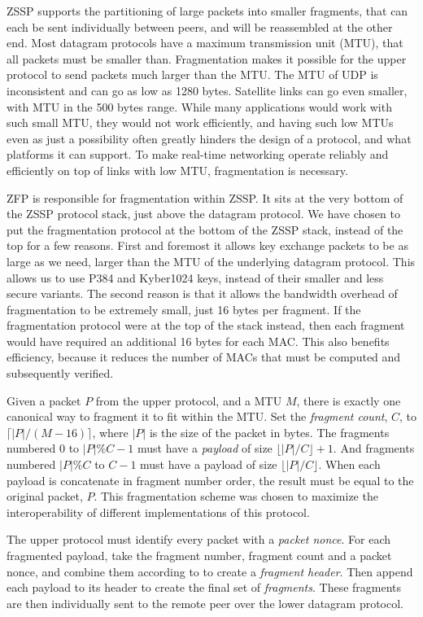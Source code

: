 \documentclass{article}
\begin{document}
ZSSP supports the partitioning of large packets into smaller fragments, that can each be sent individually between peers, and will be reassembled at the other end. Most datagram protocols have a maximum transmission unit (MTU), that all packets must be smaller than. Fragmentation makes it possible for the upper protocol to send packets much larger than the MTU. The MTU of UDP is inconsistent and can go as low as 1280 bytes. Satellite links can go even smaller, with MTU in the 500 bytes range. While many applications would work with such small MTU, they would not work efficiently, and having such low MTUs even as just a possibility often greatly hinders the design of a protocol, and what platforms it can support. To make real-time networking operate reliably and efficiently on top of links with low MTU, fragmentation is necessary.

ZFP is responsible for fragmentation within ZSSP. It sits at the very bottom of the ZSSP protocol stack, just above the datagram protocol. We have chosen to put the fragmentation protocol at the bottom of the ZSSP stack, instead of the top for a few reasons. First and foremost it allows key exchange packets to be as large as we need, larger than the MTU of the underlying datagram protocol. This allows us to use P384 and Kyber1024 keys, instead of their smaller and less secure variants. The second reason is that it allows the bandwidth overhead of fragmentation to be extremely small, just 16 bytes per fragment. If the fragmentation protocol were at the top of the stack instead, then each fragment would have required an additional 16 bytes for each MAC. This also benefits efficiency, because it reduces the number of MACs that must be computed and subsequently verified.

Given a packet $P$ from the upper protocol, and a MTU $M$, there is exactly one canonical way to fragment it to fit within the MTU. Set the \emph{fragment count}, $C$, to $\lceil|P|/(M - 16)\rceil$, where $|P|$ is the size of the packet in bytes. The fragments numbered 0 to $|P|\%C - 1$ must have a \emph{payload} of size $\lfloor|P|/C\rfloor + 1$. And fragments numbered $|P|\%C$ to $C - 1$ must have a payload of size $\lfloor|P|/C\rfloor$. When each payload is concatenate in fragment number order, the result must be equal to the original packet, $P$. This fragmentation scheme was chosen to maximize the interoperability of different implementations of this protocol.

The upper protocol must identify every packet with a \emph{packet nonce}. For each fragmented payload, take the fragment number, fragment count and a packet nonce, and combine them according to  to create a \emph{fragment header}. Then append each payload to its header to create the final set of \emph{fragments}. These fragments are then individually sent to the remote peer over the lower datagram protocol.
\end{document}
